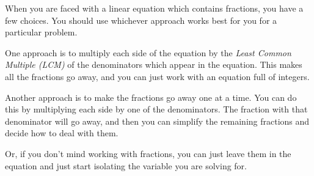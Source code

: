 \documentclass[fleqn]{article}
\begin{document}
When you are faced with a linear equation which contains fractions, you have a few choices.  You should use
whichever approach works best for you for a particular problem.

One approach is to multiply each side of the equation by the {\em Least Common Multiple (LCM)} of the denominators which
appear in the equation.  This makes all the fractions go away, and you can just work with an equation full of integers.

Another approach is to make the fractions go away one at a time.  You can do this by multiplying each side by one of the
denominators.  The fraction with that denominator will go away, and then you can simplify the
remaining fractions and decide how to deal with them.

Or, if you don't mind working with fractions, you can just leave them in the equation and just start isolating the variable
you are solving for.
\end{document}
